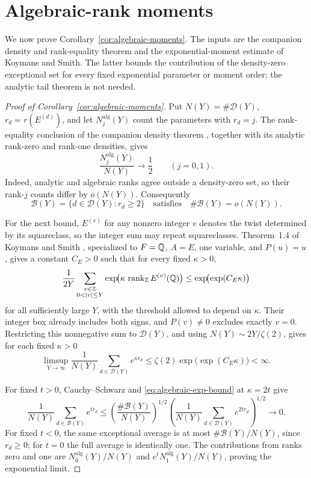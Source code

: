 \section{Algebraic-rank moments}\label{sec:algebraic}

We now prove Corollary~\ref{cor:algebraic-moments}.
The inputs are the companion density and rank-equality theorem and
the exponential-moment estimate of Koymans and Smith.
The latter bounds the contribution of the density-zero exceptional set
for every fixed exponential parameter or moment order; the analytic
tail theorem is not needed.

\begin{proof}[Proof of Corollary~\ref{cor:algebraic-moments}]
Put \(N(Y)=\#\mathcal D(Y)\), \(r_d=r(E^{(d)})\), and let
\(N_j^{\mathrm{alg}}(Y)\) count the parameters with \(r_d=j\).
The rank-equality conclusion of the companion density theorem
\cite[Theorem~1.2]{OpenAIAnalyticDensityV2}, together with its analytic
rank-zero and rank-one densities, gives
\[
 \frac{N_j^{\mathrm{alg}}(Y)}{N(Y)}\longrightarrow\frac12
 \qquad(j=0,1).
\]
Indeed, analytic and algebraic ranks agree outside a density-zero set,
so their rank-\(j\) counts differ by \(o(N(Y))\). Consequently
\[
 \mathcal B(Y)=\{d\in\mathcal D(Y):r_d\ge2\}
 \quad\text{satisfies}\quad
 \#\mathcal B(Y)=o(N(Y)).
\]

For the next bound, \(E^{(v)}\) for any nonzero integer \(v\) denotes
the twist determined by its squareclass, so the integer sum may repeat
squareclasses. Theorem~1.4 of Koymans and Smith
\cite{KoymansSmith2026}, specialized to \(F=\mathbb Q\), \(A=E\),
one variable, and \(P(u)=u\), gives a constant \(C_E>0\) such that
for every fixed \(\kappa>0\),
\[
 \frac1{2Y}\sum_{\substack{v\in\Z\\0<|v|\le Y}}
 \exp\!\bigl(\kappa\,\operatorname{rank}_{\Z}E^{(v)}(\Q)\bigr)
 \le \exp\!\bigl(\exp(C_E\kappa)\bigr)
\]
for all sufficiently large \(Y\), with the threshold allowed to depend
on \(\kappa\). Their integer box already includes both signs, and
\(P(v)\ne0\) excludes exactly \(v=0\). Restricting this nonnegative
sum to \(\mathcal D(Y)\), and using
\(N(Y)\sim2Y/\zeta(2)\), gives for each fixed \(\kappa>0\)
\begin{equation}\label{eq:algebraic-exp-bound}
 \limsup_{Y\to\infty}\frac1{N(Y)}
 \sum_{d\in\mathcal D(Y)}e^{\kappa r_d}
 \le \zeta(2)\exp\!\bigl(\exp(C_E\kappa)\bigr)<\infty.
\end{equation}

For fixed \(t>0\), Cauchy--Schwarz and
\eqref{eq:algebraic-exp-bound} at \(\kappa=2t\) give
\[
 \frac1{N(Y)}\sum_{d\in\mathcal B(Y)}e^{t r_d}
 \le
 \left(\frac{\#\mathcal B(Y)}{N(Y)}\right)^{1/2}
 \left(\frac1{N(Y)}
       \sum_{d\in\mathcal D(Y)}e^{2t r_d}\right)^{1/2}
 \longrightarrow0.
\]
For fixed \(t<0\), the same exceptional average is at most
\(\#\mathcal B(Y)/N(Y)\), since \(r_d\ge0\); for \(t=0\) the full
average is identically one. The contributions from ranks zero and one
are \(N_0^{\mathrm{alg}}(Y)/N(Y)\) and
\(e^tN_1^{\mathrm{alg}}(Y)/N(Y)\), proving the exponential limit.


\end{proof}

